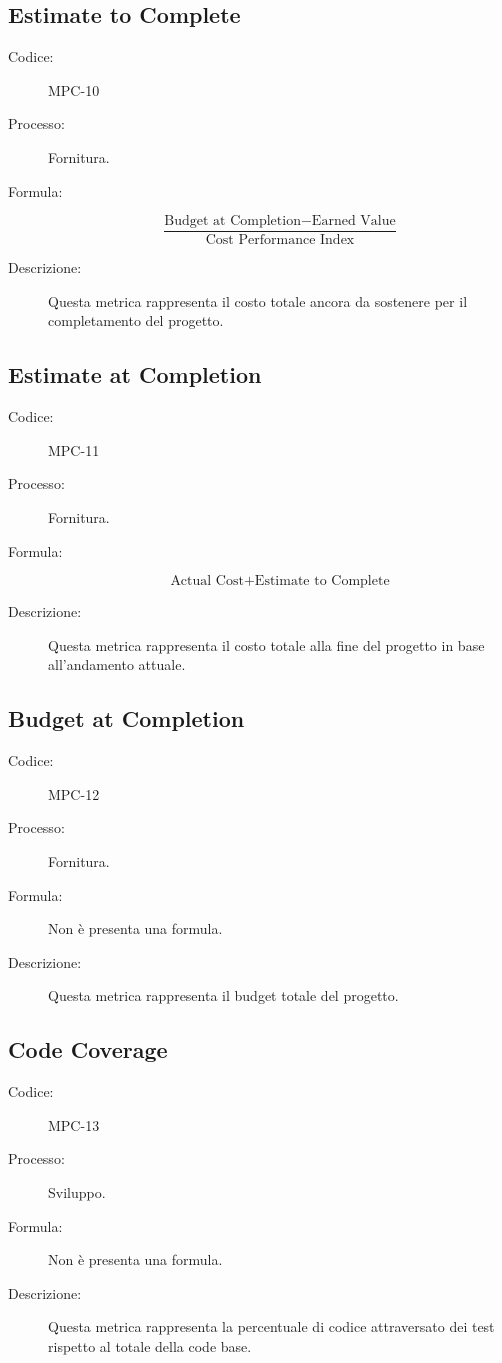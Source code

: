 \subsection{Estimate to Complete}
\begin{description}
    \item[Codice:] MPC-10
    \item[Processo:] Fornitura.
    \item[Formula:] 
    \begin{equation}
        \frac{\text{Budget at Completion} - \text{Earned Value}}{\text{Cost Performance Index}}
    \end{equation}
    \item[Descrizione:] Questa metrica rappresenta il costo totale ancora da sostenere per il completamento del progetto.
\end{description}

\subsection{Estimate at Completion}
\begin{description}
    \item[Codice:] MPC-11
    \item[Processo:] Fornitura.
    \item[Formula:]
    \begin{equation}
        \text{Actual Cost} + \text{Estimate to Complete}
    \end{equation}
    \item[Descrizione:] Questa metrica rappresenta il costo totale alla fine del progetto in base all'andamento attuale.
\end{description}

\subsection{Budget at Completion}
\begin{description}
    \item[Codice:] MPC-12
    \item[Processo:] Fornitura.
    \item[Formula:] Non è presenta una formula.
    \item[Descrizione:] Questa metrica rappresenta il budget totale del progetto.
\end{description}

\subsection{Code Coverage}
\begin{description}
    \item[Codice:] MPC-13
    \item[Processo:] Sviluppo.
    \item[Formula:] Non è presenta una formula.
    \item[Descrizione:] Questa metrica rappresenta la percentuale di codice attraversato dei test rispetto al totale della code base.
\end{description}

